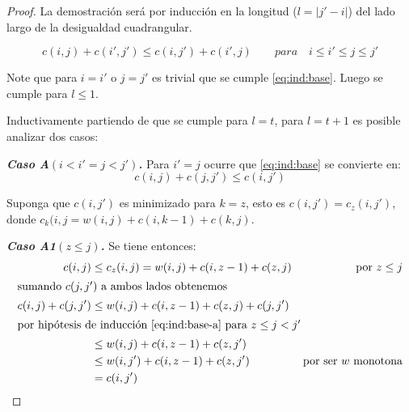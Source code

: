 \documentclass[spanish]{llncs}
\begin{document}
\begin{proof}
	La demostración será por inducción en la longitud ($l = |j' - i|$) del lado largo
	de la desigualdad cuadrangular.
																										
	\begin{equation}
		\label{eq:ind:base}
		c(i,j) + c(i',j') \le c(i,j') + c(i',j) \qquad para \quad i \le i' \le j \le j'
	\end{equation}
																										
	Note que para $i=i'$ o $j=j'$ es trivial que se cumple \eqref{eq:ind:base}. Luego
	se cumple para $l \le 1$.
																									
	Inductivamente partiendo de que se cumple para $l=t$, para $l=t+1$ es posible
	analizar dos casos:
																									
	\textbf{\emph{Caso A\;$(i < i' = j < j')$.}} Para $i'=j$ ocurre que \eqref{eq:ind:base}
	se convierte en:
	\begin{equation}
		\label{eq:ind:base-a}
		c(i,j) + c(j,j') \le c(i,j')
	\end{equation}
																									
	Suponga que $c(i,j')$ es minimizado para $k=z$, esto es $c(i,j') = c_z(i,j')$,
	donde $c_k(i,j = w(i,j) + c(i,k-1) + c(k,j)$.
																									
	\textbf{\emph{Caso A1\;$(z \le j)$.}} Se tiene entonces:
	\begin{align*}
		c(i,j)           & \le c_z(i,j) = w(i,j) + c(i,z-1) + c(z,j) & \text{por $z \le j$}        \\
		\intertext{sumando $c(j,j')$ a ambos lados obtenemos}
		c(i,j) + c(j,j') & \le w(i,j) + c(i,z-1) + c(z,j) + c(j,j')  &                             \\
		\intertext{por hipótesis de inducción \eqref{eq:ind:base-a} para $z \le j < j'$}
		                 & \le w(i,j) + c(i,z-1) + c(z,j')           &                             \\
		                 & \le w(i,j') + c(i,z-1) + c(z,j')          & \text{por ser $w$ monotona} \\
		                 & =c(i,j')                                  &                             
	\end{align*}
																				

\end{proof}
\end{document}
